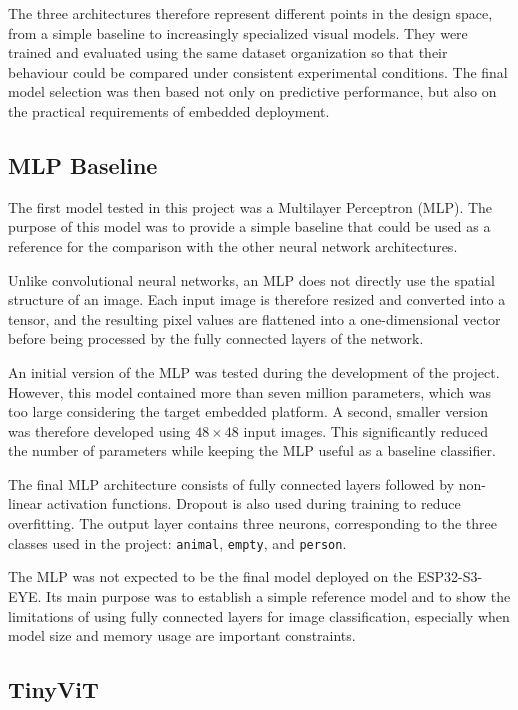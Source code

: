 \documentclass{article}
\begin{document}
The three architectures therefore represent different points in the design
space, from a simple baseline to increasingly specialized visual models.
They were trained and evaluated using the same dataset organization so that
their behaviour could be compared under consistent experimental conditions.
The final model selection was then based not only on predictive performance,
but also on the practical requirements of embedded deployment.

\subsection{MLP Baseline}
\label{subsec:mlp}

The first model tested in this project was a Multilayer Perceptron (MLP).
The purpose of this model was to provide a simple baseline that could be
used as a reference for the comparison with the other neural network
architectures.

Unlike convolutional neural networks, an MLP does not directly use the
spatial structure of an image. Each input image is therefore resized and
converted into a tensor, and the resulting pixel values are flattened into
a one-dimensional vector before being processed by the fully connected
layers of the network.

An initial version of the MLP was tested during the development of the
project. However, this model contained more than seven million parameters,
which was too large considering the target embedded platform. A second,
smaller version was therefore developed using $48 \times 48$ input images.
This significantly reduced the number of parameters while keeping the MLP
useful as a baseline classifier.

The final MLP architecture consists of fully connected layers followed by
non-linear activation functions. Dropout is also used during training to
reduce overfitting. The output layer contains three neurons, corresponding
to the three classes used in the project: \texttt{animal},
\texttt{empty}, and \texttt{person}.

The MLP was not expected to be the final model deployed on the
ESP32-S3-EYE. Its main purpose was to establish a simple reference model
and to show the limitations of using fully connected layers for image
classification, especially when model size and memory usage are important
constraints.

\subsection{TinyViT}
\label{subsec:tinyvit}
\end{document}

